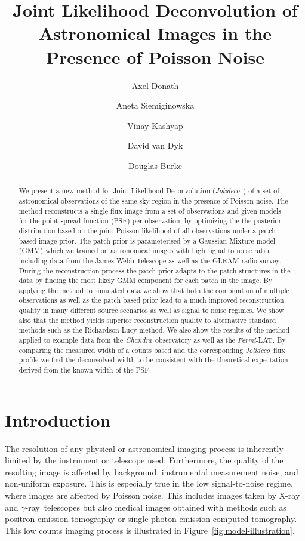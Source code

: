 \documentclass[twocolumn]{aastex631}
\newcommand{\chandra}{\textit{Chandra}~}
\newcommand{\ferminospace}{\textit{Fermi}-LAT}
\newcommand{\jolideco}{\textit{Jolideco}~}
\newcommand{\gammaray}{$\gamma$-ray\xspace}
\newcommand{\xray}{X-ray\xspace}
\begin{document}
    \title{Joint Likelihood Deconvolution of Astronomical Images in the Presence of Poisson Noise}

    \author[0000-0003-4568-7005]{Axel Donath}
    \author[0000-0002-0905-7375]{Aneta Siemiginowska}
    \author[0000-0002-3869-7996]{Vinay Kashyap} 
    \author[0000-0002-0816-331X]{David van Dyk}
    \author[0000-0003-4428-7835]{Douglas Burke}
    


    \begin{abstract}
        We present a new method for Joint Likelihood Deconvolution (\jolideco) of a set of astronomical observations of the same sky region in the presence of Poisson noise. The method reconstructs a single flux image from a set of observations and given models for the point spread function (PSF) per observation, by optimizing the the posterior distribution based on the joint Poisson likelihood of all observations under a patch based image prior. The patch prior is parameterised by a Gaussian Mixture model (GMM) which we trained on astronomical images with high signal to noise ratio, including data from the  James Webb Telescope as well as the GLEAM radio survey. During the reconstruction process the patch prior adapts to the patch structures in the data by finding the most likely GMM component for each patch in the image. By applying the method to simulated data we show that both the combination of multiple observations as well as the patch based prior lead to a much improved reconstruction quality in many different source scenarios as well as signal to noise regimes. We show also that the method yields superior reconstruction quality to alternative standard methods such as the Richardson-Lucy method. We also show the results of the method applied to example data from the \chandra observatory as well as the \ferminospace. By comparing the measured width of a counts based and the corresponding \jolideco flux profile we find the deconvolved width to be consistent with the theoretical expectation derived from the known width of the PSF.
    \end{abstract}



    \section{Introduction}
    The resolution of any physical or astronomical imaging process is inherently limited by the instrument or telescope used. Furthermore, the quality of the resulting image is affected by background, instrumental measurement noise, and non-uniform exposure. This is especially true in the low signal-to-noise regime, where images are affected by Poisson noise. This includes images taken by \xray and \gammaray~telescopes but also medical images obtained with methods such as positron emission tomography or single-photon emission computed tomography. This low counts imaging process is illustrated in Figure~\ref{fig:model-illustration}.
\end{document}
